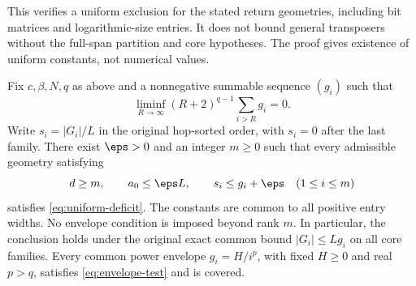 This verifies a uniform exclusion for the stated return geometries,
including bit matrices and logarithmic-size entries. It does not bound
general transposers without the full-span partition and core hypotheses.
The proof gives existence of uniform constants, not numerical values.

\begin{corollary}\label{cor:common-envelope}
Fix $c,\beta,N,q$ as above and a nonnegative summable sequence $(g_i)$
such that
\begin{equation}\label{eq:envelope-test}
 \liminf_{R\to\infty}(R+2)^{q-1}\sum_{i>R}g_i=0.
\end{equation}
Write $s_i=|G_i|/L$ in the original hop-sorted order, with $s_i=0$
after the last family. There exist $\eps>0$ and an integer $m\ge0$
such that every admissible geometry satisfying
\[
 d\ge m,\qquad a_0\le\eps L,\qquad
 s_i\le g_i+\eps\quad(1\le i\le m)
\]
satisfies \cref{eq:uniform-deficit}. The constants are common to all
positive entry widths. No envelope condition is imposed beyond rank $m$.
In particular, the conclusion holds under the original exact common bound
$|G_i|\le Lg_i$ on all core families. Every common power envelope
$g_i=H/i^p$, with fixed $H\ge0$ and real $p>q$, satisfies
\cref{eq:envelope-test} and is covered.
\end{corollary}
